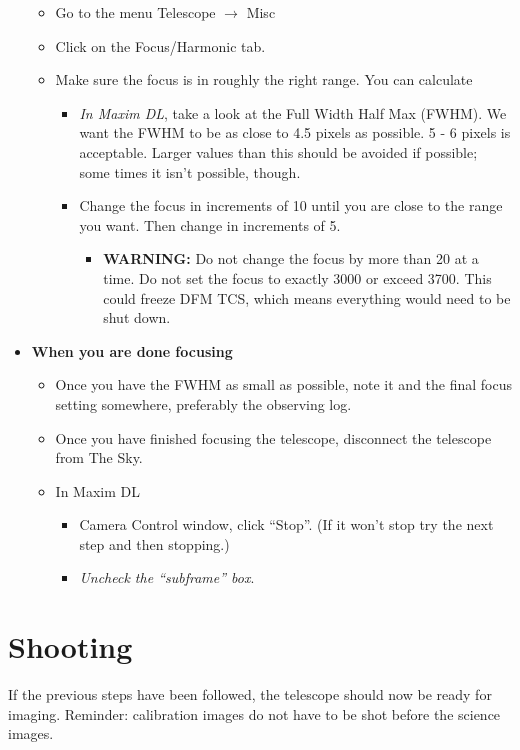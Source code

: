 \documentclass[letterpaper, 12pt]{report}
\begin{document}
\begin{itemize}
	\begin{itemize}
		\item Go to the menu Telescope $\rightarrow$ Misc
		\item Click on the Focus/Harmonic tab.
		\item Make sure the focus is in roughly the right range. You can calculate
		\begin{itemize}
			\item \emph{In Maxim DL}, take a look at the Full Width Half Max (FWHM). We want the FWHM to be as close to 4.5 pixels as possible. 5 - 6 pixels is acceptable. Larger values than this should be avoided if possible; some times it isn't possible, though.
			\item Change the focus in increments of 10 until you are close to the range you want. Then change in increments of 5.
			\begin{itemize}
				\item {\large \textbf{WARNING:}} Do not change the focus by more than 20 at a time. Do not set the focus to exactly 3000 or exceed 3700. This could freeze DFM TCS, which means everything would need to be shut down.
			\end{itemize}
		\end{itemize}
	\end{itemize}
	\item {\large \textbf{When you are done focusing}}
	\begin{itemize}
		\item Once you have the FWHM as small as possible, note it and the final focus setting somewhere, preferably the observing log.
		\item Once you have finished focusing the telescope, disconnect the telescope from The Sky.
		\item In Maxim DL
		\begin{itemize}
			\item Camera Control window, click ``Stop''. (If it won't stop try the next step and then stopping.)
			\item \emph{Uncheck the ``subframe'' box}.
		\end{itemize}
	\end{itemize}
\end{itemize}

\chapter{Shooting}\label{ch:shooting}

If the previous steps have been followed, the telescope should now be ready for imaging. Reminder: calibration images do not have to be shot before the science images.
\end{document}

